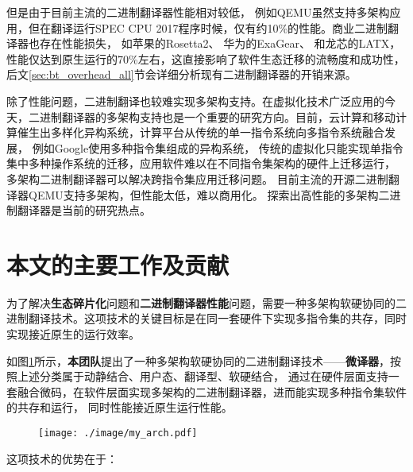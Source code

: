 但是由于目前主流的二进制翻译器性能相对较低，
例如QEMU\cite{bellardQEMUFastPortable2005}虽然支持多架构应用，但在翻译运行SPEC CPU 2017\cite{SPECCPU2017}程序时候，仅有约10\%的性能。商业二进制翻译器也存在性能损失，
如苹果的Rosetta2\cite{RosettaTranslationEnvironment, RunningIntelBinaries}、
华为的ExaGear\cite{KunPengExaGear}、
和龙芯的LATX\cite{LoongArchEnv2022, LoongArch2023}，
性能仅达到原生运行的70\%左右，这直接影响了软件生态迁移的流畅度和成功性，
后文\ref{sec:bt_overhead_all}节会详细分析现有二进制翻译器的开销来源。

除了性能问题，二进制翻译也较难实现多架构支持。在虚拟化技术广泛应用的今天，二进制翻译器的多架构支持也是一个重要的研究方向。目前，云计算和移动计算催生出多样化异构系统，计算平台从传统的单一指令系统向多指令系统融合发展，
例如Google使用多种指令集组成的异构系统，
传统的虚拟化只能实现单指令集中多种操作系统的迁移，应用软件难以在不同指令集架构的硬件上迁移运行，
多架构二进制翻译器可以解决跨指令集应用迁移问题。
目前主流的开源二进制翻译器QEMU支持多架构，但性能太低，难以商用化。
探索出高性能的多架构二进制翻译器是当前的研究热点。

\section{本文的主要工作及贡献}

为了解决\textbf{生态碎片化}问题和\textbf{二进制翻译器性能}问题，需要一种多架构软硬协同的二进制翻译技术。这项技术的关键目标是在同一套硬件下实现多指令集的共存，同时实现接近原生的运行效率。

如图\ref{img:my_arch}所示，\textbf{本团队}提出了一种多架构软硬协同的二进制翻译技术——\textbf{微译器}，按照上述分类属于动静结合、用户态、翻译型、软硬结合，
通过在硬件层面支持一套融合微码，在软件层面实现多架构的二进制翻译器，进而能实现多种指令集软件的共存和运行，
同时性能接近原生运行性能。


\begin{figure}[!htbp]
    \centering
    \texttt{[image: ./image/my\_arch.pdf]}
    \label{img:my_arch}
  \end{figure}

这项技术的优势在于：

